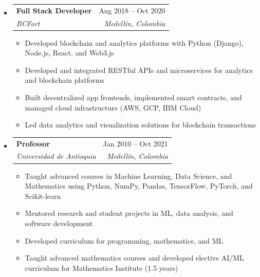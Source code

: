 \documentclass[letterpaper,11pt]{article}
\makeatletter
\newcommand{\resumeSubheading}[4]{
  \vspace{-2pt}
  \item[]
  \begin{tabular*}{\textwidth}{@{\extracolsep{\fill}}l r}
    \textbf{#1} & #2 \\
    \textit{#3} & \textit{#4} \\
  \end{tabular*}
  \vspace{-5pt}
}
\makeatother
\begin{document}
\begin{itemize}[leftmargin=0pt, itemindent=0pt, label={}, itemsep=1pt]
\resumeSubheading
{Full Stack Developer}{Aug 2018 -- Oct 2020}
{BCFort}{Medellín, Colombia}
\begin{itemize}[leftmargin=*, itemsep=0pt]
    \item Developed blockchain and analytics platforms with Python (Django), Node.js, React, and Web3.js
    \item Developed and integrated RESTful APIs and microservices for analytics and blockchain platforms
    \item Built decentralized app frontends, implemented smart contracts, and managed cloud infrastructure (AWS, GCP, IBM Cloud)
    \item Led data analytics and visualization solutions for blockchain transactions
\end{itemize}

\resumeSubheading
{Professor}{Jan 2010 -- Oct 2021}
{Universidad de Antioquia}{Medellín, Colombia}
\begin{itemize}[leftmargin=*, itemsep=0pt]
    \item Taught advanced courses in Machine Learning, Data Science, and Mathematics using Python, NumPy, Pandas, TensorFlow, PyTorch, and Scikit-learn
    \item Mentored research and student projects in ML, data analysis, and software development
    \item Developed curriculum for programming, mathematics, and ML
    \item Taught advanced mathematics courses and developed elective AI/ML curriculum for Mathematics Institute (1.5 years)
\end{itemize}
\end{itemize}
\end{document}
